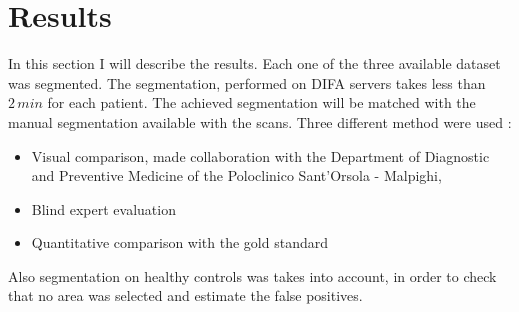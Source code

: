 \documentclass{standalone}
\begin{document}
	
	\section{Results}
	
	In this section I will describe the results. Each one of the three available dataset was segmented. The segmentation, performed on DIFA servers takes less than $2\,min$ for each patient. The achieved segmentation will be matched with the manual segmentation available with the scans. Three different method were used : 
	\begin{itemize}
		
		\item Visual comparison, made collaboration with the Department of Diagnostic and Preventive Medicine of the Poloclinico Sant'Orsola - Malpighi, 
		
		\item Blind expert evaluation
		
		\item Quantitative comparison with the gold standard
	\end{itemize}

	Also segmentation on healthy controls was takes into account, in order to check that no area was selected and estimate the false positives.
	
\end{document}
